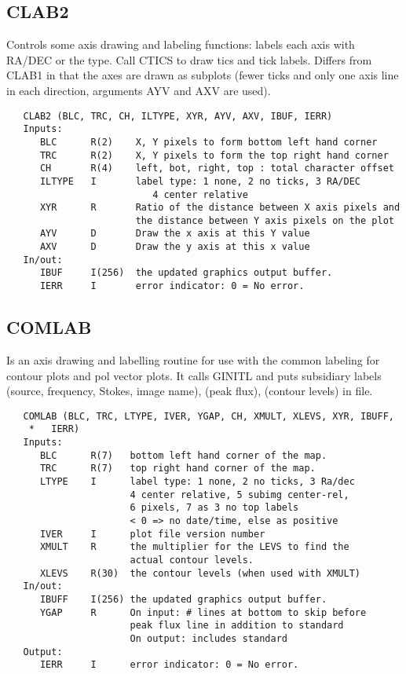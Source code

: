 \subsection{CLAB2}
Controls some axis drawing and labeling functions:
labels each axis with RA/DEC or the type.
Call CTICS to draw tics and tick labels.
Differs from CLAB1 in that the axes are drawn as subplots (fewer
ticks and only one axis line in each direction, arguments AYV and
AXV are used).
\begin{verbatim}
   CLAB2 (BLC, TRC, CH, ILTYPE, XYR, AYV, AXV, IBUF, IERR)
   Inputs:
      BLC      R(2)    X, Y pixels to form bottom left hand corner
      TRC      R(2)    X, Y pixels to form the top right hand corner
      CH       R(4)    left, bot, right, top : total character offset
      ILTYPE   I       label type: 1 none, 2 no ticks, 3 RA/DEC
                          4 center relative
      XYR      R       Ratio of the distance between X axis pixels and
                       the distance between Y axis pixels on the plot
      AYV      D       Draw the x axis at this Y value
      AXV      D       Draw the y axis at this x value
   In/out:
      IBUF     I(256)  the updated graphics output buffer.
      IERR     I       error indicator: 0 = No error.
\end{verbatim}

\subsection{COMLAB}
Is an axis drawing and labelling routine for use with the
common labeling for contour plots and pol vector plots.  It calls
GINITL and puts subsidiary labels (source, frequency, Stokes, image
name), (peak flux), (contour levels) in file.
\begin{verbatim}
   COMLAB (BLC, TRC, LTYPE, IVER, YGAP, CH, XMULT, XLEVS, XYR, IBUFF,
    *   IERR)
   Inputs:
      BLC      R(7)   bottom left hand corner of the map.
      TRC      R(7)   top right hand corner of the map.
      LTYPE    I      label type: 1 none, 2 no ticks, 3 Ra/dec
                      4 center relative, 5 subimg center-rel,
                      6 pixels, 7 as 3 no top labels
                      < 0 => no date/time, else as positive
      IVER     I      plot file version number
      XMULT    R      the multiplier for the LEVS to find the
                      actual contour levels.
      XLEVS    R(30)  the contour levels (when used with XMULT)
   In/out:
      IBUFF    I(256) the updated graphics output buffer.
      YGAP     R      On input: # lines at bottom to skip before
                      peak flux line in addition to standard
                      On output: includes standard
   Output:
      IERR     I      error indicator: 0 = No error.
\end{verbatim}

